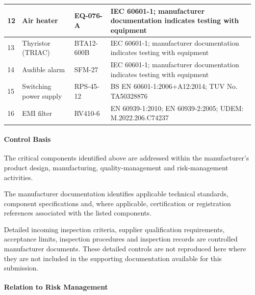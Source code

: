 \begin{longtable}{|p{}|p{}|p{}|p{}|}
12 &
Air heater &
EQ-076-A &
IEC 60601-1; manufacturer documentation
indicates testing with equipment
\\
\hline

13 &
Thyristor (TRIAC) &
BTA12-600B &
IEC 60601-1; manufacturer documentation
indicates testing with equipment
\\
\hline

14 &
Audible alarm &
SFM-27 &
IEC 60601-1; manufacturer documentation
indicates testing with equipment
\\
\hline

15 &
Switching power supply &
RPS-45-12 &
BS EN 60601-1:2006+A12:2014;
TUV No. TA50328876
\\
\hline

16 &
EMI filter &
RV410-6 &
EN 60939-1:2010; EN 60939-2:2005;
UDEM: M.2022.206.C74237
\\
\hline

\end{longtable}

\endgroup


\paragraph{Control Basis}

The critical components identified above are addressed within
the manufacturer's product design, manufacturing,
quality-management and risk-management activities.

The manufacturer documentation identifies applicable technical
standards, component specifications and, where applicable,
certification or registration references associated with the
listed components.

Detailed incoming inspection criteria, supplier qualification
requirements, acceptance limits, inspection procedures and
inspection records are controlled manufacturer documents.
These detailed controls are not reproduced here where they are
not included in the supporting documentation available for
this submission.


\paragraph{Relation to Risk Management}


